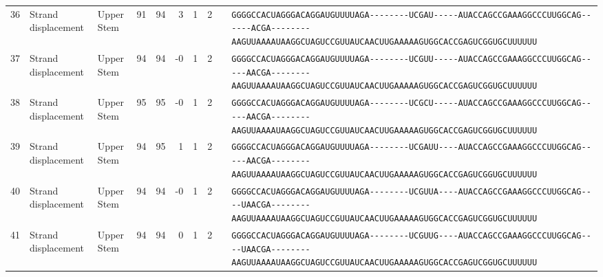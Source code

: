 \begin{tabular}{rllrrrrrcl}
 36 & Strand displacement & Upper Stem & 91 & 94 & 3 & 1 & 2 &  &
 \color{ucsfblack}\verb|GGGGCCACUAGGGACAGGAU|\color{ucsfblue}\verb|GUUUUAGA--------UCGAU-----|\color{ucsfpurple}\verb|AUACCAGCCGAAAGGCCCUUGGCAG|\color{ucsfblue}\verb|------ACGA--------AAGUUAAAAU|\color{ucsfnavy}\verb|AAGGCUAGUCCGU|\color{ucsfteal}\verb|UAUCAACUUGAAAAAGUGGCACCGAGUCGGUGC|\color{ucsfblack}\verb|UUUUUU| \\

 37 & Strand displacement & Upper Stem & 94 & 94 & -0 & 1 & 2 &  &
 \color{ucsfblack}\verb|GGGGCCACUAGGGACAGGAU|\color{ucsfblue}\verb|GUUUUAGA--------UCGUU-----|\color{ucsfpurple}\verb|AUACCAGCCGAAAGGCCCUUGGCAG|\color{ucsfblue}\verb|-----AACGA--------AAGUUAAAAU|\color{ucsfnavy}\verb|AAGGCUAGUCCGU|\color{ucsfteal}\verb|UAUCAACUUGAAAAAGUGGCACCGAGUCGGUGC|\color{ucsfblack}\verb|UUUUUU| \\

 38 & Strand displacement & Upper Stem & 95 & 95 & -0 & 1 & 2 &  &
 \color{ucsfblack}\verb|GGGGCCACUAGGGACAGGAU|\color{ucsfblue}\verb|GUUUUAGA--------UCGCU-----|\color{ucsfpurple}\verb|AUACCAGCCGAAAGGCCCUUGGCAG|\color{ucsfblue}\verb|-----AACGA--------AAGUUAAAAU|\color{ucsfnavy}\verb|AAGGCUAGUCCGU|\color{ucsfteal}\verb|UAUCAACUUGAAAAAGUGGCACCGAGUCGGUGC|\color{ucsfblack}\verb|UUUUUU| \\

 39 & Strand displacement & Upper Stem & 94 & 95 & 1 & 1 & 2 &  &
 \color{ucsfblack}\verb|GGGGCCACUAGGGACAGGAU|\color{ucsfblue}\verb|GUUUUAGA--------UCGAUU----|\color{ucsfpurple}\verb|AUACCAGCCGAAAGGCCCUUGGCAG|\color{ucsfblue}\verb|-----AACGA--------AAGUUAAAAU|\color{ucsfnavy}\verb|AAGGCUAGUCCGU|\color{ucsfteal}\verb|UAUCAACUUGAAAAAGUGGCACCGAGUCGGUGC|\color{ucsfblack}\verb|UUUUUU| \\

 40 & Strand displacement & Upper Stem & 94 & 94 & -0 & 1 & 2 &  &
 \color{ucsfblack}\verb|GGGGCCACUAGGGACAGGAU|\color{ucsfblue}\verb|GUUUUAGA--------UCGUUA----|\color{ucsfpurple}\verb|AUACCAGCCGAAAGGCCCUUGGCAG|\color{ucsfblue}\verb|----UAACGA--------AAGUUAAAAU|\color{ucsfnavy}\verb|AAGGCUAGUCCGU|\color{ucsfteal}\verb|UAUCAACUUGAAAAAGUGGCACCGAGUCGGUGC|\color{ucsfblack}\verb|UUUUUU| \\

 41 & Strand displacement & Upper Stem & 94 & 94 & 0 & 1 & 2 &  &
 \color{ucsfblack}\verb|GGGGCCACUAGGGACAGGAU|\color{ucsfblue}\verb|GUUUUAGA--------UCGUUG----|\color{ucsfpurple}\verb|AUACCAGCCGAAAGGCCCUUGGCAG|\color{ucsfblue}\verb|----UAACGA--------AAGUUAAAAU|\color{ucsfnavy}\verb|AAGGCUAGUCCGU|\color{ucsfteal}\verb|UAUCAACUUGAAAAAGUGGCACCGAGUCGGUGC|\color{ucsfblack}\verb|UUUUUU| \\


\end{tabular}
